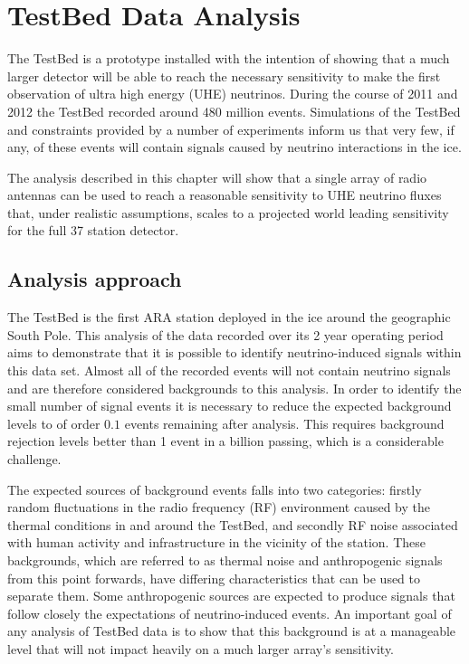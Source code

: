 \chapter{TestBed Data Analysis}
\label{chap:Analysis}

The TestBed is a prototype installed with the intention of showing that a much larger detector will be able to reach the necessary sensitivity to make the first observation of ultra high energy (UHE) neutrinos. During the course of 2011 and 2012 the TestBed recorded around 480 million events. Simulations of the TestBed and constraints provided by a number of experiments inform us that very few, if any, of these events will contain signals caused by neutrino interactions in the ice. 

The analysis described in this chapter will show that a single array of radio antennas can be used to reach a reasonable sensitivity to UHE neutrino fluxes that, under realistic assumptions, scales to a projected world leading sensitivity for the full 37 station detector.

\section{Analysis approach}
\label{sec:Analysis:Analysis-Approach}

The TestBed is the first ARA station deployed in the ice around the geographic South Pole. This analysis of the data recorded over its 2 year operating period aims to demonstrate that it is possible to identify neutrino-induced signals within this data set. Almost all of the recorded events will not contain neutrino signals and are therefore considered backgrounds to this analysis. In order to identify the small number of signal events it is necessary to reduce the expected background levels to of order $0.1$ events remaining after analysis. This requires background rejection levels better than 1 event in a billion passing, which is a considerable challenge.

The expected sources of background events falls into two categories: firstly random fluctuations in the radio frequency (RF) environment caused by the thermal conditions in and around the TestBed, and secondly RF noise associated with human activity and infrastructure in the vicinity of the station. These backgrounds, which are referred to as thermal noise and anthropogenic signals from this point forwards, have differing characteristics that can be used to separate them. Some anthropogenic sources are expected to produce signals that follow closely the expectations of neutrino-induced events. An important goal of any analysis of TestBed data is to show that this background is at a manageable level that will not impact heavily on a much larger array's sensitivity.

